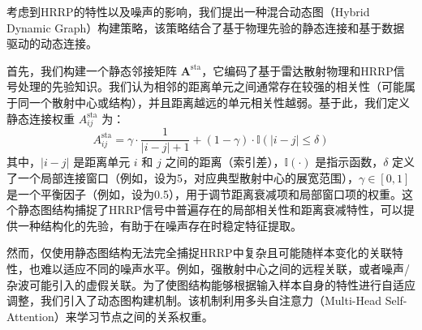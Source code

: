 考虑到HRRP的特性以及噪声的影响，我们提出一种混合动态图（Hybrid Dynamic Graph）构建策略，该策略结合了基于物理先验的静态连接和基于数据驱动的动态连接。

首先，我们构建一个静态邻接矩阵 $\mathbf{A}^{\text{sta}}$，它编码了基于雷达散射物理和HRRP信号处理的先验知识。我们认为相邻的距离单元之间通常存在较强的相关性（可能属于同一个散射中心或结构），并且距离越远的单元相关性越弱。基于此，我们定义静态连接权重 $A^{\text{sta}}_{ij}$ 为：
\begin{equation}
    A^{\text{sta}}_{ij} = \gamma \cdot \frac{1}{|i-j|+1} + (1-\gamma) \cdot \mathbb{I}(|i-j| \leq \delta)
    \label{eq:static_adjacency}
\end{equation}
其中，$|i-j|$ 是距离单元 $i$ 和 $j$ 之间的距离（索引差），$\mathbb{I}(\cdot)$ 是指示函数，$\delta$ 定义了一个局部连接窗口（例如，设为5，对应典型散射中心的展宽范围），$\gamma \in [0,1]$ 是一个平衡因子（例如，设为0.5），用于调节距离衰减项和局部窗口项的权重。这个静态图结构捕捉了HRRP信号中普遍存在的局部相关性和距离衰减特性，可以提供一种结构化的先验，有助于在噪声存在时稳定特征提取。

然而，仅使用静态图结构无法完全捕捉HRRP中复杂且可能随样本变化的关联特性，也难以适应不同的噪声水平。例如，强散射中心之间的远程关联，或者噪声/杂波可能引入的虚假关联。为了使图结构能够根据输入样本自身的特性进行自适应调整，我们引入了动态图构建机制。该机制利用多头自注意力（Multi-Head Self-Attention）来学习节点之间的关系权重。

